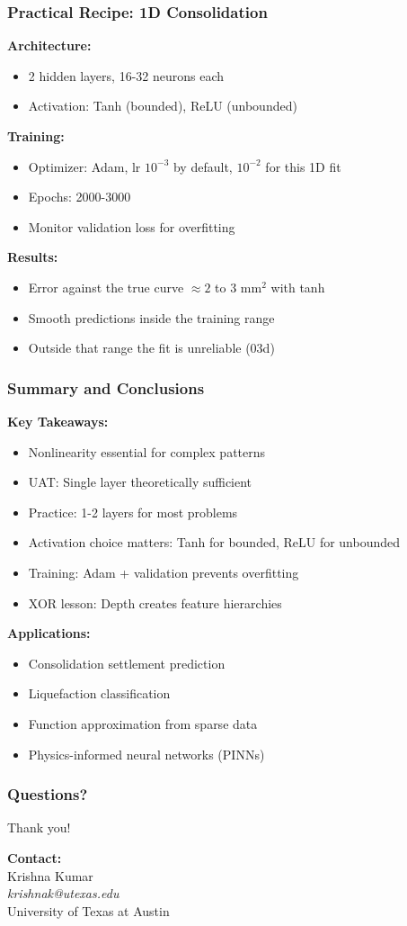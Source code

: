 \documentclass{beamer}
\begin{document}
\begin{frame}
\frametitle{Practical Recipe: 1D Consolidation}

\textbf{Architecture:}
\begin{itemize}
\item 2 hidden layers, 16-32 neurons each
\item Activation: Tanh (bounded), ReLU (unbounded)
\end{itemize}

\textbf{Training:}
\begin{itemize}
\item Optimizer: Adam, lr $10^{-3}$ by default, $10^{-2}$ for this 1D fit
\item Epochs: 2000-3000
\item Monitor validation loss for overfitting
\end{itemize}

\textbf{Results:}
\begin{itemize}
\item Error against the true curve $\approx 2$ to 3 mm$^2$ with tanh
\item Smooth predictions inside the training range
\item Outside that range the fit is unreliable (03d)
\end{itemize}

\end{frame}

\begin{frame}
\frametitle{Summary and Conclusions}

\textbf{Key Takeaways:}
\begin{itemize}
\item Nonlinearity essential for complex patterns
\item UAT: Single layer theoretically sufficient
\item Practice: 1-2 layers for most problems
\item Activation choice matters: Tanh for bounded, ReLU for unbounded
\item Training: Adam + validation prevents overfitting
\item XOR lesson: Depth creates feature hierarchies
\end{itemize}

\textbf{Applications:}
\begin{itemize}
\item Consolidation settlement prediction
\item Liquefaction classification
\item Function approximation from sparse data
\item Physics-informed neural networks (PINNs)
\end{itemize}

\end{frame}

\begin{frame}
\frametitle{Questions?}

\centering
\Large Thank you!

\vspace{2cm}

\textbf{Contact:} \\
Krishna Kumar \\
\textit{krishnak@utexas.edu} \\
University of Texas at Austin

\end{frame}
\end{document}
